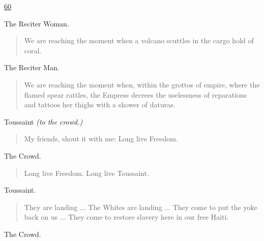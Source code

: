 \documentclass[letterpaper,article,12pt,oneside,notitlepage]{memoir}
\begin{document}
\href{http://cesaire.elotroalex.com/chiens/chiens/p060.html}{60}

\begin{center}The Reciter Woman.\end{center}

\begin{verse}
\hspace{1cm} We are reaching the moment when a volcano scuttles in the cargo hold of coral. \\
\end{verse}

\begin{center}The Reciter Man.\end{center}

\begin{verse}
We are reaching the moment when, within the grottos of empire, where the flamed spear rattles, the Empress decrees the uselessness of reparations and tattoos her thighs with a shower of daturas. \\
\end{verse}

\begin{center}Toussaint \textit{(to the crowd.)}\end{center}

\begin{verse}
\hspace{1cm} My friends, shout it with me: Long live Freedom. \\
\end{verse}

\begin{center}The Crowd.\end{center}

\begin{verse}
\hspace{1cm} Long live Freedom. Long live Toussaint. \\
\end{verse}

\begin{center}Toussaint.\end{center}

\begin{verse}
\indent They are landing ... The Whites are landing ... They come to put the yoke back on us ... They come to restore slavery here in our free Haiti. \\
\end{verse}

\begin{center}The Crowd.\end{center}
\end{document}
